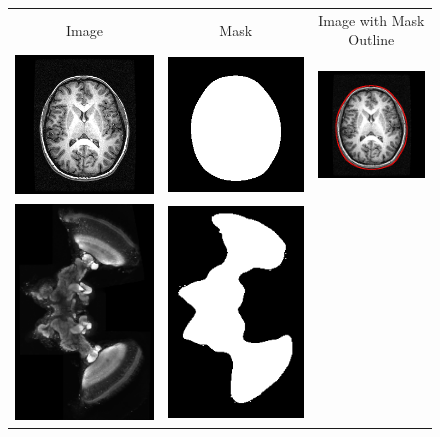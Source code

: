 \documentclass{InsightArticle}
\begin{document}
\begin{figure}[tb]
\begin{center}
\begin{tabular}{ccc}
Image & Mask & Image with Mask Outline \\
\includegraphics[width=.3\linewidth]{img/levelset_spgr_spgr}&
\includegraphics[width=.3\linewidth]{img/levelset_spgr_mask}&
\includegraphics[width=.3\linewidth]{img/levelset_spgr_ovl} \\
\includegraphics[width=.3\linewidth]{img/levelset_locust_clsm}&
\includegraphics[width=.3\linewidth]{img/levelset_locust_mask}&

\end{tabular}
\end{center}
\end{figure}
\end{document}
